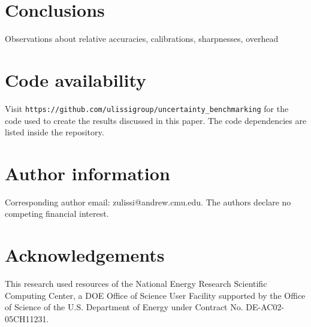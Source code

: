 \documentclass[]{achemso}
\begin{document}

\section{Conclusions}

Observations about relative accuracies, calibrations, sharpnesses, overhead



\section*{Code availability} Visit \texttt{https://github.com/ulissigroup/uncertainty\_benchmarking} for the code used to create the results discussed in this paper.
The code dependencies are listed inside the repository.

\section*{Author information} Corresponding author email:  zulissi@andrew.cmu.edu.
The authors declare no competing financial interest.

\section*{Acknowledgements} This research used resources of the National Energy Research Scientific Computing Center, a DOE Office of Science User Facility supported by the Office of Science of the U.S. Department of Energy under Contract No. DE-AC02-05CH11231. %



\clearpage

\end{document}
